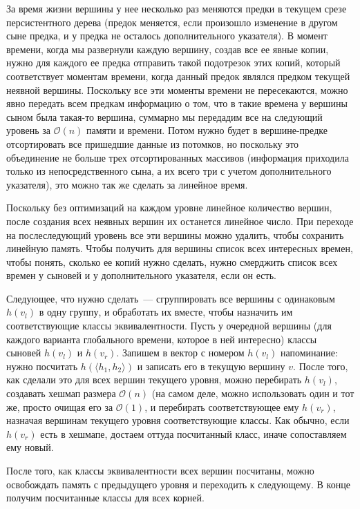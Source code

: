 За время жизни вершины у нее несколько раз меняются предки в текущем срезе персистентного дерева (предок меняется, если произошло изменение в другом сыне предка, и у предка не осталось дополнительного указателя). В момент времени, когда мы развернули каждую вершину, создав все ее явные копии, нужно для каждого ее предка отправить такой подотрезок этих копий, который соответствует моментам времени, когда данный предок являлся предком текущей неявной вершины. Поскольку все эти моменты времени не пересекаются, можно явно передать всем предкам информацию о том, что в такие времена у вершины сыном была такая-то вершина, суммарно мы передадим все на следующий уровень за $\mathcal{O}(n)$ памяти и времени. Потом нужно будет в вершине-предке отсортировать все пришедшие данные из потомков, но поскольку это объединение не больше трех отсортированных массивов (информация приходила только из непосредственного сына, а их всего три с учетом дополнительного указателя), это можно так же сделать за линейное время.

Поскольку без оптимизаций на каждом уровне линейное количество вершин, после создания всех неявных вершин их останется линейное число. При переходе на послеследующий уровень все эти вершины можно удалить, чтобы сохранить линейную память.
Чтобы получить для вершины список всех интересных времен, чтобы понять, сколько ее копий нужно сделать, нужно смерджить список всех времен у сыновей и у дополнительного указателя, если он есть. 

Следующее, что нужно сделать~--- сгруппировать все вершины с одинаковым $h(v_l)$ в одну группу, и обработать их вместе, чтобы назначить им соответствующие классы эквивалентности. Пусть у очередной вершины (для каждого варианта глобального времени, которое в ней интересно) классы сыновей $h(v_l)$ и $h(v_r)$. Запишем в вектор с номером $h(v_l)$ напоминание: нужно посчитать $h(\langle h_1, h_2 \rangle)$ и записать его в текущую вершину $v$. После того, как сделали это для всех вершин текущего уровня, можно перебирать $h(v_l)$, создавать хешмап размера $\mathcal{O}(n)$ (на самом деле, можно использовать один и тот же, просто очищая его за $\mathcal{O}(1)$, и перебирать соответствующее ему $h(v_r)$, назначая вершинам текущего уровня соответствующие классы. Как обычно, если $h(v_r)$ есть в хешмапе, достаем оттуда посчитанный класс, иначе сопоставляем ему новый. 

После того, как классы эквивалентности всех вершин посчитаны, можно освобождать память с предыдущего уровня и переходить к следующему. В конце получим посчитанные классы для всех корней.

